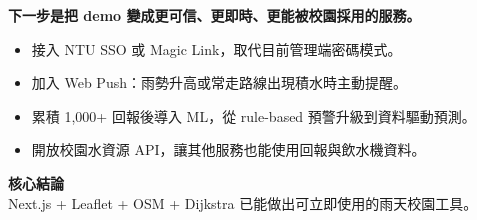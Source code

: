 \documentclass[aspectratio=169,11pt]{beamer}
\begin{document}
\begin{frame}[plain]
\colorbox{ink}{\begin{minipage}[c][\paperheight]{\paperwidth}
\vspace{0.6cm}

\vspace{0.28cm}\hspace{0.8cm}\begin{minipage}{0.78\linewidth}
{\color{white}\LARGE\bfseries 下一步是把 demo 變成更可信、更即時、更能被校園採用的服務。}
\end{minipage}

\vspace{0.55cm}\hspace{0.95cm}\begin{minipage}{0.78\linewidth}
{\color{white!85}
\begin{itemize}
\item 接入 NTU SSO 或 Magic Link，取代目前管理端密碼模式。
\item 加入 Web Push：雨勢升高或常走路線出現積水時主動提醒。
\item 累積 1,000+ 回報後導入 ML，從 rule-based 預警升級到資料驅動預測。
\item 開放校園水資源 API，讓其他服務也能使用回報與飲水機資料。
\end{itemize}}
\end{minipage}

\vfill{}\hfill
\begin{minipage}{0.34\linewidth}
{\color{blue!25!white}\bfseries 核心結論}\\
{\color{white}Next.js + Leaflet + OSM + Dijkstra 已能做出可立即使用的雨天校園工具。}
\end{minipage}\hspace{0.9cm}\vspace{0.6cm}
\end{minipage}}
\end{frame}
\end{document}
